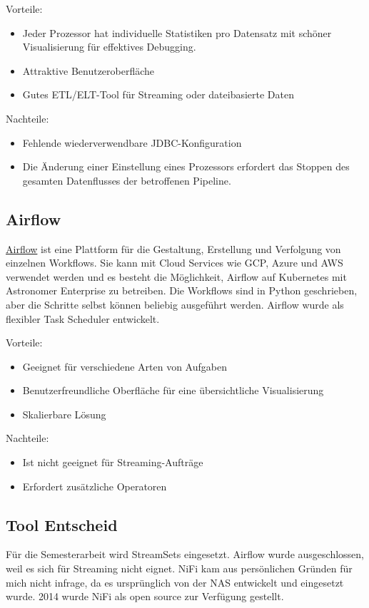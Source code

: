 Vorteile: 
\begin{itemize}
  \item Jeder Prozessor hat individuelle Statistiken pro Datensatz mit sch{\"o}ner Visualisierung f{\"u}r effektives Debugging. 
  \item Attraktive Benutzeroberfl{\"a}che
  \item Gutes ETL/ELT-Tool f{\"u}r Streaming oder dateibasierte Daten
\end{itemize}

Nachteile: 
\begin{itemize}
  \item Fehlende wiederverwendbare JDBC-Konfiguration 
  \item Die {\"A}nderung einer Einstellung eines Prozessors erfordert das Stoppen des gesamten Datenflusses der betroffenen Pipeline.
\end{itemize}
 

\subsection{Airflow}

\href{https://airflow.apache.org}{Airflow} ist eine Plattform f{\"u}r die Gestaltung, Erstellung und Verfolgung von einzelnen Workflows. Sie kann mit Cloud Services wie GCP, Azure und AWS verwendet werden und es besteht die M{\"o}glichkeit, Airflow auf Kubernetes mit Astronomer Enterprise zu betreiben. Die Workflows sind in Python geschrieben, aber die Schritte selbst k{\"o}nnen beliebig ausgef{\"u}hrt werden. Airflow wurde als flexibler Task Scheduler entwickelt. 

Vorteile: 
\begin{itemize}
  \item Geeignet f{\"u}r verschiedene Arten von Aufgaben
  \item Benutzerfreundliche Oberfl{\"a}che f{\"u}r eine {\"u}bersichtliche Visualisierung
  \item Skalierbare L{\"o}sung
\end{itemize}

Nachteile: 
\begin{itemize}
  \item Ist nicht geeignet f{\"u}r Streaming-Auftr{\"a}ge 
  \item Erfordert zus{\"a}tzliche Operatoren
\end{itemize}

\subsection{Tool Entscheid}
F{\"u}r die Semesterarbeit wird StreamSets eingesetzt. Airflow wurde ausgeschlossen, weil es sich f{\"u}r Streaming nicht eignet. NiFi kam aus pers{\"o}nlichen Gr{\"u}nden f{\"u}r mich nicht infrage, da es urspr{\"u}nglich von der NAS entwickelt und eingesetzt wurde. 2014 wurde  NiFi als open source zur Verf{\"u}gung gestellt.

